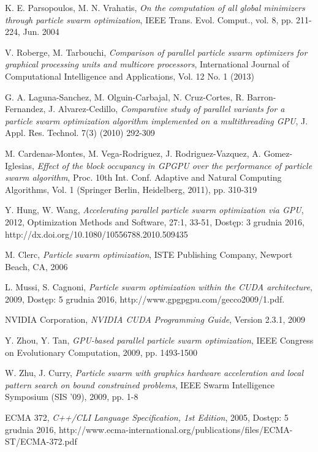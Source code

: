 \documentclass[12pt, twoside, openany, abstract=on]{report}
\theoremstyle{definition}
\begin{document}
\begin{thebibliography}{11}
 K. E. Parsopoulos, M. N. Vrahatis, \emph{On the computation of all global minimizers through particle swarm optimization}, IEEE Trans. Evol. Comput., vol. 8, pp. 211-224, Jun. 2004


 V. Roberge, M. Tarbouchi, \emph{Comparison of parallel particle swarm optimizers for graphical processing units and multicore processors}, International Journal of Computational Intelligence and Applications, Vol. 12 No. 1 (2013)

 G. A. Laguna-Sanchez, M. Olguin-Carbajal, N. Cruz-Cortes, R. Barron-Fernandez, J. Alvarez-Cedillo, \emph{Comparative study of parallel variants for a particle swarm optimization algorithm implemented on a multithreading GPU}, J. Appl. Res. Technol. 7(3) (2010) 292-309

 M. Cardenas-Montes, M. Vega-Rodriguez, J. Rodriguez-Vazquez, A. Gomez-Iglesias, \emph{Effect of the block occupancy in GPGPU over the performance of particle swarm algorithm}, Proc. 10th Int. Conf. Adaptive and Natural Computing Algorithms, Vol. 1 (Springer Berlin, Heidelberg, 2011), pp. 310-319


 Y. Hung, W. Wang, \emph{Accelerating parallel particle swarm optimization via GPU}, 2012, Optimization Methods and Software, 27:1, 33-51, Dostęp: 3 grudnia 2016, http://dx.doi.org/10.1080/10556788.2010.509435

 M. Clerc, \emph{Particle swarm optimization}, ISTE Publishing Company, Newport Beach, CA, 2006

 L. Mussi, S. Cagnoni, \emph{Particle swarm optimization within the CUDA architecture}, 2009, Dostęp: 5 grudnia 2016, http://www.gpgpgpu.com/gecco2009/1.pdf.

 NVIDIA Corporation, \emph{NVIDIA CUDA Programming Guide}, Version 2.3.1, 2009

 Y. Zhou, Y. Tan, \emph{GPU-based parallel particle swarm optimization}, IEEE Congress on Evolutionary Computation, 2009, pp. 1493-1500

 W. Zhu, J. Curry, \emph{Particle swarm with graphics hardware acceleration and local pattern search on bound constrained problems}, IEEE Swarm Intelligence Symposium (SIS '09), 2009, pp. 1-8

 ECMA 372, \emph{C++/CLI Language Specification, 1st Edition}, 2005, Dostęp: 5 grudnia 2016, http://www.ecma-international.org/publications/files/ECMA-ST/ECMA-372.pdf 

\end{thebibliography}
\end{document}

